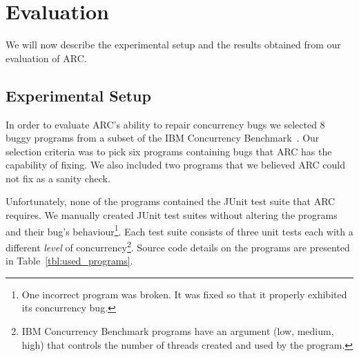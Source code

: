 \section{Evaluation}
\label{sec:experiments}

We will now describe the experimental setup and the results obtained from our evaluation of ARC.


\subsection{Experimental Setup}
\label{sec:experimental_setup}

In order to evaluate ARC's ability to repair concurrency bugs we selected 8 buggy programs from a subset of the IBM Concurrency Benchmark~\cite{EHSU06}. Our selection
criteria was to pick six programs containing bugs that ARC has the
capability of fixing. We also included two programs that we believed ARC could not fix as a sanity check.

Unfortunately, none of the programs contained the JUnit test suite that ARC
requires. We manually created JUnit test suites without altering the programs
and their bug's behaviour\footnote{One incorrect program was broken.  It was fixed so that it
properly exhibited its concurrency bug.}. Each test suite consists of three
unit tests each with a different \textit{level} of concurrency\footnote{IBM
Concurrency Benchmark programs have an argument (low, medium, high) that controls the number of
threads created and used by the program.}. Source code details on the programs are
presented in Table~\ref{tbl:used_programs}.

